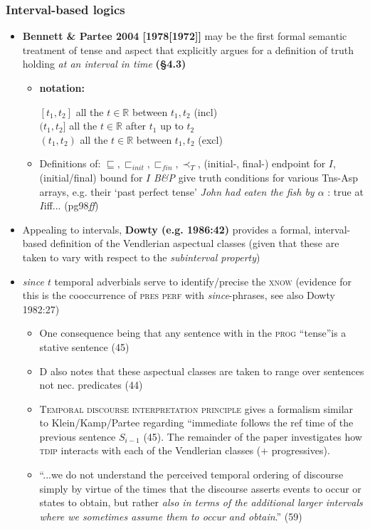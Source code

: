 \documentclass[10pt]{article}
\begin{document}
\subsubsection{Interval-based logics}
\begin{itemize}
	\item \textbf{Bennett \& Partee 2004 [1978[1972]]} may be the first formal semantic treatment of tense and aspect that explicitly argues for a definition of truth holding \textit{at an interval in time} \textbf{(§4.3)}
	\begin{itemize}
		\item \textbf{notation:}
		
		$ [t_1,t_2] $ all the $ t\in\mathbb R $ between $ t_1,t_2 $ (incl)\\
		$ (t_1,t_2] $ all the $ t\in\mathbb R $ after $ t_1$ up to $t_2 $\\
		$ (t_1,t_2) $ all the $ t\in\mathbb R $ between $ t_1,t_2 $ (excl)\\
	\item Definitions of: $ \sqsubseteq,\sqsubset_{init},\sqsubset_{fin},\prec_T $, (initial-, final-) endpoint for $ I $, (initial/final) bound for $ I $
	\textit{B\&P} give truth conditions for various Tns-Asp arrays, e.g. their `past perfect tense' \textit{John had eaten the fish by $ \alpha $} : true at $ I $iff... (pg98\textit{ff})
	\end{itemize}
\item Appealing to intervals,\textbf{ Dowty (e.g. 1986:42)} provides a formal, interval-based definition of the Vendlerian aspectual classes (given that these are taken to vary with respect to the \textit{subinterval property})
\item \textit{since $ t $} temporal adverbials serve to identify/precise the \textsc{xnow} (evidence for this is the cooccurrence of \textsc{pres perf} with \textit{since}-phrases, see also Dowty 1982:27)
\begin{itemize}
	\item One consequence being that any sentence with in the \textsc{prog} ``tense''is a stative sentence (45)
	\item D also notes that these aspectual classes are taken to range over sentences not nec. predicates (44)
	\item \textsc{Temporal discourse interpretation principle} gives a formalism similar to Klein/Kamp/Partee regarding ``immediate follows the ref time of the previous sentence $ S_{i-1} $ (45). The remainder of the paper investigates how \textsc{tdip} interacts with each of the Vendlerian classes (+ progressives).
	\item ``...we do not understand the perceived temporal ordering of discourse simply by virtue of the times that the discourse asserts events to occur or states to obtain, but rather \textit{also in terms of the additional larger intervals where we sometimes assume them to occur and obtain}.'' (59)
\end{itemize}
\end{itemize}
\end{document}
